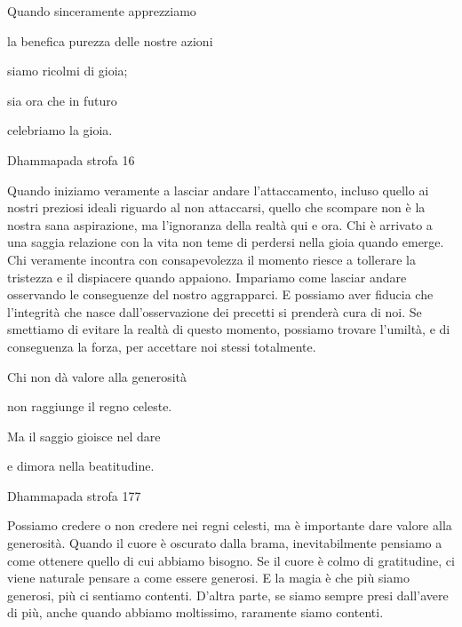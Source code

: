 \documentclass[a4paper,portrait,12pt]{article}
\begin{document}
\newpage



Quando sinceramente apprezziamo


la benefica purezza delle nostre azioni


siamo ricolmi di gioia;


sia ora che in futuro 


celebriamo la gioia. 





Dhammapada strofa 16





\newpage



Quando iniziamo veramente a lasciar andare l'attaccamento, incluso quello ai nostri preziosi ideali riguardo al non attaccarsi, quello che scompare non \`{e} la nostra sana aspirazione, ma l'ignoranza della realt\`{a} qui e ora. Chi \`{e} arrivato a una saggia relazione con la vita non teme di perdersi nella gioia quando emerge. Chi veramente incontra con consapevolezza il momento riesce a tollerare la tristezza e il dispiacere quando appaiono. Impariamo come lasciar andare osservando le conseguenze del nostro aggrapparci. E possiamo aver fiducia che l'integrit\`{a} che nasce dall'osservazione dei precetti si prender\`{a} cura di noi. Se smettiamo di evitare la realt\`{a} di questo momento, possiamo trovare l'umilt\`{a}, e di conseguenza la forza, per accettare noi stessi totalmente. 


\newpage



Chi non d\`{a} valore alla generosit\`{a}


non raggiunge il regno celeste.


Ma il saggio gioisce nel dare


e dimora nella beatitudine.





Dhammapada strofa 177


\newpage



Possiamo credere o non credere nei regni celesti, ma \`{e} importante dare valore alla generosit\`{a}. Quando il cuore \`{e} oscurato dalla brama, inevitabilmente pensiamo a  come ottenere quello di cui abbiamo bisogno. Se il cuore \`{e} colmo di gratitudine, ci viene naturale pensare a come essere generosi. E la magia \`{e} che più siamo generosi, più ci sentiamo contenti. D'altra parte, se siamo sempre presi dall'avere di più, anche quando abbiamo moltissimo, raramente siamo contenti.
\end{document}
